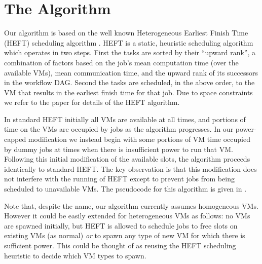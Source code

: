 \documentclass[10pt, conference, compsocconf]{IEEEtran} %
\begin{document}
\section{The Algorithm}

Our algorithm is based on the well known Heterogeneous Earliest Finish Time (HEFT) scheduling algorithm \cite{Topcuoglu2002heft}.
HEFT is a static, heuristic scheduling algorithm which operates in two steps.
First the tasks are sorted by their ``upward rank'', a combination of factors based on the job's mean computation time (over the available VMs), mean communication time, and the upward rank of its successors in the workflow DAG.
Second the tasks are scheduled, in the above order, to the VM that results in the earliest finish time for that job.
Due to space constraints we refer to the paper \cite{Topcuoglu2002heft} for details of the HEFT algorithm.

In standard HEFT initially all VMs are available at all times, and portions of time on the VMs are occupied by jobs as the algorithm progresses.
In our power-capped modification we instead begin with some portions of VM time occupied by dummy jobs at times when there is insufficient power to run that VM.
Following this initial modification of the available slots, the algorithm proceeds identically to standard HEFT.
The key observation is that this modification does not interfere with the running of HEFT except to prevent jobs from being scheduled to unavailable VMs.
The pseudocode for this algorithm is given in .

Note that, despite the name, our algorithm currently assumes homogeneous VMs.
However it could be easily extended for heterogeneous VMs as follows: no VMs are spawned initially, but HEFT is allowed to schedule jobs to free slots on existing VMs (as normal) \emph{or} to spawn any type of new VM for which there is sufficient power.
This could be thought of as reusing the HEFT scheduling heuristic to decide which VM types to spawn.

\end{document}
